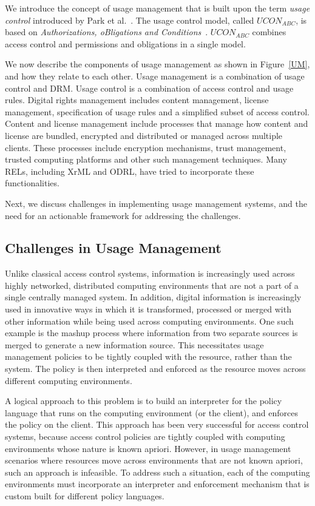 We introduce the concept of usage management that is built upon the term {\em usage control} introduced by Park et al.~\cite{PaSa:04}. The usage control model, called  $UCON_{ABC}$, is based on {\em Authorizations, oBligations and Conditions}~\cite{PaSa:04}. $UCON_{ABC}$ combines access control and  permissions and obligations in a single model. 

We now describe the components of usage management as shown in Figure~\ref{UM}, and how they relate to each other. Usage management is a combination of usage control and DRM.  Usage control is a combination of access control and usage rules. Digital rights management includes content management, license management, specification of usage rules and a simplified subset of access control.  Content and license management include processes that manage how content and license are bundled, encrypted and distributed or managed across multiple clients. These processes include encryption mechanisms, trust management, trusted computing platforms and other such management techniques. Many RELs, including XrML and ODRL, have tried to incorporate these functionalities. 

Next, we discuss challenges in implementing usage management systems, and the need for an actionable framework for addressing the challenges. 

\subsection{Challenges in Usage Management}
Unlike classical access control systems, information is increasingly used across highly networked, distributed computing environments that are not a part of a single centrally managed system.  In addition, digital information is increasingly used in innovative ways in which it is transformed, processed or merged with other information while being used across computing environments. One such example is the mashup process where information from two separate sources is merged to generate a new information source. This necessitates usage management policies to be tightly coupled with the resource, rather than the system. The policy is then interpreted and enforced as the resource moves across different computing environments. 

A logical approach to this problem is to build an interpreter for the policy language that runs on the computing environment (or the client), and enforces the policy on the client. This approach has been very successful for access control systems, because access control policies are tightly coupled with computing environments whose nature is known apriori.  However, in usage management scenarios where resources move across environments that are not known apriori, such an approach is infeasible. To address such a situation, each of the computing environments must  incorporate an interpreter and enforcement mechanism that is custom built for different policy languages. 


